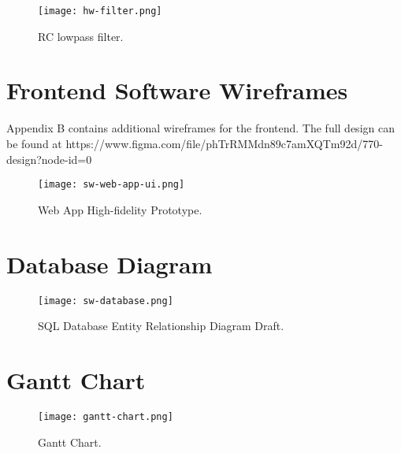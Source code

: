 \begin{figure}[!ht]
	\centering
	\texttt{[image: hw-filter.png]}
	\caption{RC lowpass filter.}
	\label{fig:filter}
\end{figure}

\chapter{Frontend Software Wireframes}

Appendix B contains additional wireframes for the frontend. The full design can be found at https://www.figma.com/file/phTrRMMdn89c7amXQTm92d/770-design?node-id=0%

\begin{figure}[!ht]
	\centering
	\texttt{[image: sw-web-app-ui.png]}
	\caption{Web App High-fidelity Prototype.}
	\label{fig:webapp-1}
\end{figure}

\chapter{Database Diagram}

\begin{figure}[!ht]
	\centering
	\texttt{[image: sw-database.png]}
	\caption{SQL Database Entity Relationship Diagram Draft.}
	\label{fig:database-1}
\end{figure}

\chapter{Gantt Chart}

\begin{figure}[!ht]
	\centering
	\texttt{[image: gantt-chart.png]}
	\caption{Gantt Chart.}
	\label{fig:gantt-chart-1}
\end{figure}